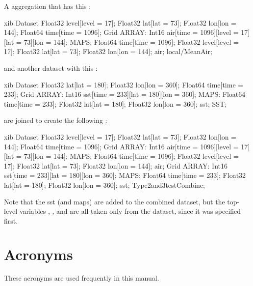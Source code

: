 \documentclass{dods-book}
\begin{document}
A  aggregation that has this \dds :

\begin{vcode}{xib}
Dataset {
  Float32 level[level = 17];
  Float32 lat[lat = 73];
  Float32 lon[lon = 144];
  Float64 time[time = 1096];
  Grid {
    ARRAY:
      Int16 air[time = 1096][level = 17][lat = 73][lon = 144];
    MAPS:
      Float64 time[time = 1096];
      Float32 level[level = 17];
      Float32 lat[lat = 73];
      Float32 lon[lon = 144];
  } air;
} local/MeanAir;
\end{vcode}

and another dataset with this \dds :

\begin{vcode}{xib}
Dataset {
  Float32 lat[lat = 180];
  Float32 lon[lon = 360];
  Float64 time[time = 233];
  Grid {
    ARRAY:
      Int16 sst[time = 233][lat = 180][lon = 360];
    MAPS:
      Float64 time[time = 233];
      Float32 lat[lat = 180];
      Float32 lon[lon = 360];
  } sst;
} SST;
\end{vcode}

are joined to create the following \dds :

\begin{vcode}{xib}
Dataset {
  Float32 level[level = 17];
  Float32 lat[lat = 73];
  Float32 lon[lon = 144];
  Float64 time[time = 1096];
  Grid {
    ARRAY:
      Int16 air[time = 1096][level = 17][lat = 73][lon = 144];
    MAPS:
      Float64 time[time = 1096];
      Float32 level[level = 17];
      Float32 lat[lat = 73];
      Float32 lon[lon = 144];
  } air;
  Grid {
    ARRAY:
      Int16 sst[time = 233][lat = 180][lon = 360];
    MAPS:
      Float64 time[time = 233];
      Float32 lat[lat = 180];
      Float32 lon[lon = 360];
  } sst;
} Type2and3testCombine;
\end{vcode}

Note that the sst  (and maps) are added to the combined
dataset, but the top-level variables , , and
 are all taken only from the  dataset, since
it was specified first.



\appendix
\chapter{Acronyms}

These acronyms are used frequently in this manual.
\end{document}
